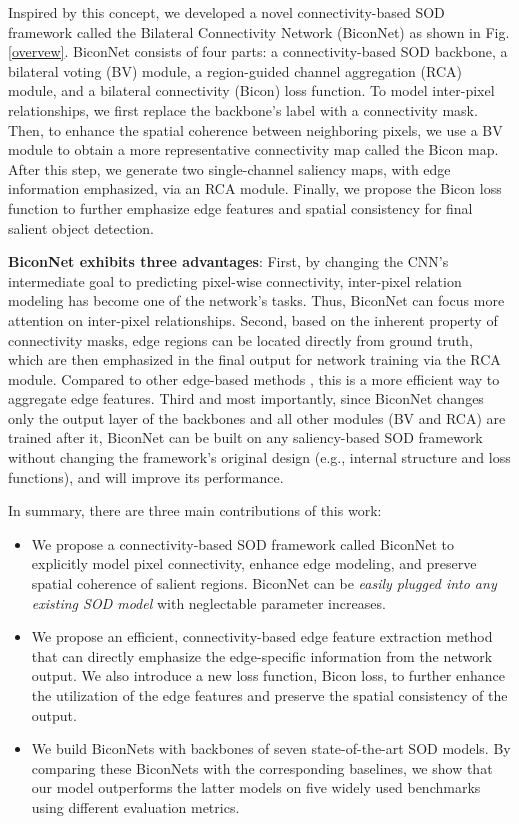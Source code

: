 \documentclass[final]{cvpr}
\begin{document}
Inspired by this concept, we developed a novel connectivity-based SOD framework called the Bilateral Connectivity Network (BiconNet) as shown in Fig. \ref{overvew}. BiconNet consists of four parts: a connectivity-based SOD backbone, a bilateral voting (BV) module, a region-guided channel aggregation (RCA) module, and a bilateral connectivity (Bicon) loss function. To model inter-pixel relationships, we first replace the backbone’s label with a connectivity mask. Then, to enhance the spatial coherence between neighboring pixels, we use a BV module to obtain a more representative connectivity map called the Bicon map. After this step, we generate two single-channel saliency maps, with edge information emphasized, via an RCA module. Finally, we propose the Bicon loss function to further emphasize edge features and spatial consistency for final salient object detection. 



\textbf{BiconNet exhibits three advantages}: First, by changing the CNN’s intermediate goal to predicting pixel-wise connectivity, inter-pixel relation modeling has become one of the network’s tasks. Thus, BiconNet can focus more attention on inter-pixel relationships. Second, based on the inherent property of connectivity masks, edge regions can be located directly from ground truth, which are then emphasized in the final output for network training via the RCA module. Compared to other edge-based methods \cite{egnet,poolnet}, this is a more efficient way to aggregate edge features. Third and most importantly, since BiconNet changes only the output layer of the backbones and all other modules (BV and RCA) are trained after it, BiconNet can be built on any saliency-based SOD framework without changing the framework’s original design (e.g., internal structure and loss functions), and will improve its performance. 

In summary, there are three main contributions of this work:

\begin{itemize}
\item We propose a connectivity-based SOD framework called BiconNet to explicitly model pixel connectivity, enhance edge modeling, and preserve spatial coherence of salient regions. BiconNet can be \textit{easily plugged into any existing SOD model} with neglectable parameter increases. 

\item We propose an efficient, connectivity-based edge feature extraction method that can directly emphasize the edge-specific information from the network output. We also introduce a new loss function, Bicon loss, to further enhance the utilization of the edge features and preserve the spatial consistency of the output.  

\item We build BiconNets with backbones of seven state-of-the-art SOD models. By comparing these BiconNets with the corresponding baselines, we show that our model outperforms the latter models on five widely used benchmarks using different evaluation metrics. 

\end{itemize}
\end{document}
